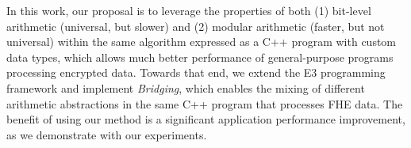 In this work, our proposal is to leverage the properties of both (1) bit-level arithmetic (universal, but slower) and (2) modular arithmetic (faster, but not universal) within the same algorithm expressed as a C++ program with custom data types, which allows much better performance of general-purpose programs processing encrypted data. 
Towards that end, we extend the E3 programming framework \cite{e3eprint} and implement \emph{Bridging}, which enables the mixing of different arithmetic abstractions in the same C++ program that processes FHE data.
The benefit of using our method is a significant application performance improvement, as we demonstrate with our experiments.

